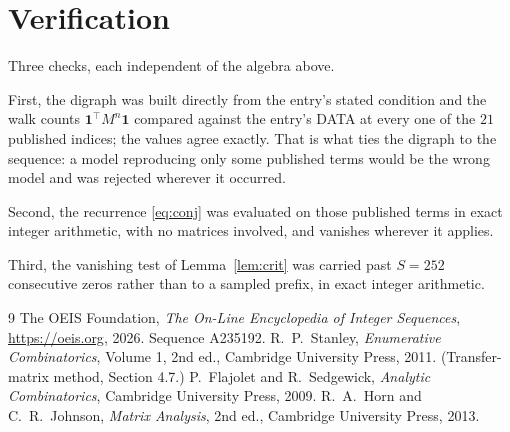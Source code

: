 \documentclass[11pt,a4paper]{article}
\theoremstyle{plain}
\theoremstyle{definition}
\begin{document}
\section{Verification}

Three checks, each independent of the algebra above.

First, the digraph was built directly from the entry's stated condition and the walk counts
$\mathbf{1}^{\!\top}M^{n}\mathbf{1}$ compared against the entry's DATA at every one of
the $21$ published indices; the values agree exactly. That is what ties the digraph to
the sequence: a model reproducing only some published terms would be the wrong model and
was rejected wherever it occurred.

Second, the recurrence \eqref{eq:conj} was evaluated on those published terms in exact
integer arithmetic, with no matrices involved, and vanishes wherever it applies.

Third, the vanishing test of Lemma~\ref{lem:crit} was carried past $S=252$ consecutive
zeros rather than to a sampled prefix, in exact integer arithmetic.

\begin{thebibliography}{9}
 The OEIS Foundation, \emph{The On-Line Encyclopedia of Integer
Sequences}, \url{https://oeis.org}, 2026. Sequence A235192.
 R.~P.~Stanley, \emph{Enumerative Combinatorics}, Volume 1, 2nd ed.,
Cambridge University Press, 2011. (Transfer-matrix method, Section 4.7.)
 P.~Flajolet and R.~Sedgewick, \emph{Analytic Combinatorics}, Cambridge
University Press, 2009.
 R.~A.~Horn and C.~R.~Johnson, \emph{Matrix Analysis}, 2nd ed., Cambridge
University Press, 2013.
\end{thebibliography}
\end{document}
